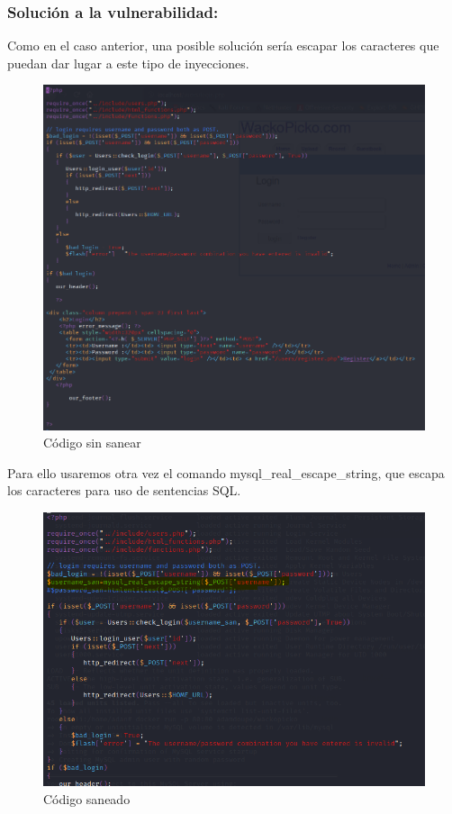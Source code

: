 \documentclass[12pt,twoside]{article}
\begin{document}
\subsubsection*{Solución a  la vulnerabilidad:}
Como en el caso anterior, una posible solución sería escapar los caracteres que puedan dar lugar a este tipo de inyecciones.
\begin{figure}[H]
    \centering
    \includegraphics[scale=0.5]{./imagenes/login_sin_sanear}
    \caption{Código sin sanear}
\end{figure}
Para ello usaremos otra vez el comando mysql\_real\_escape\_string, que escapa los caracteres para uso de sentencias SQL.
\begin{figure}[H]
    \centering
    \includegraphics[scale=0.5]{./imagenes/login_codigo_saneado}
    \caption{Código saneado}
\end{figure}
\end{document}
